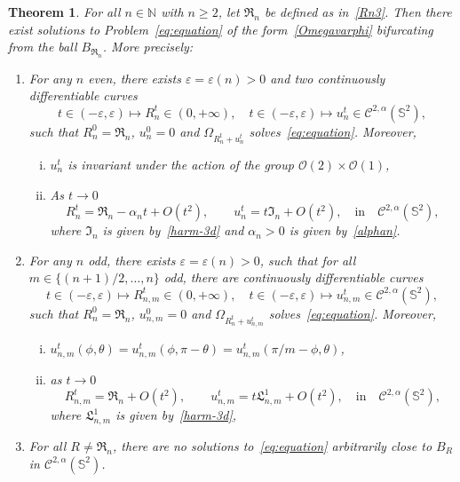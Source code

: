 \documentclass[10pt,reqno,english]{amsart}
\newcommand{\Sd}{\mathbb{S}^2}
\newcommand{\rn}{{\mathfrak R}_n  }
\newcommand{\ve}{\varepsilon}
\newtheorem{theorem}{Theorem}
\theoremstyle{definition}
\numberwithin{equation}{section}
\begin{document}
\begin{theorem}
\label{thm_N=3}
For all $n \in \mathbb{N}$ with $n \ge 2$, let $\rn$ be defined as in~\eqref{Rn3}. Then there exist solutions to Problem~\eqref{eq:equation} of the form~\eqref{Omegavarphi} bifurcating from the ball $B_{\rn}$. More precisely:

\begin{enumerate}[$\!\!$(1)$\!\!$]
\item For any $n$ even, there exists $\ve=\ve(n)>0$ and  two continuously differentiable curves
\[
t\in(-\ve,\ve)\mapsto R_n^t\in(0,+\infty), \quad t\in(-\ve,\ve)\mapsto u_n^t\in\mathcal C^{2,\alpha}(\Sd),
\]
such that $R_n^0= \rn$, $u_n^0=0$ and $\Omega_{R_n^t+u_n^t}$ solves~\eqref{eq:equation}. Moreover,
\begin{enumerate}[i)]
\item $u_n^t$ is invariant under the action of the group $\mathcal O(2)\times \mathcal O(1)$, 
\item As $t \to 0$
\[
R_n^t= \rn-\alpha_n t+ O(t^2),\qquad u_n^t=t \mathfrak I_n+O(t^2), \quad {\mbox {in}} \quad \mathcal C^{2,\alpha}(\Sd), 
\]
where $\mathfrak I_n$ is given by~\eqref{harm-3d} and $\alpha_n>0$ is given by~\eqref{alphan}.
\end{enumerate}
\item For any $n$  odd, there exists $\ve=\ve(n)>0$, such that for all $m\in\{(n+1)/2,\dots,n\}$ odd,  there are continuously differentiable curves 
\[
t\in(-\ve,\ve)\mapsto R_{n,m}^t\in(0,+\infty), \quad t\in(-\ve,\ve)\mapsto u_{n,m}^t\in\mathcal C^{2,\alpha}(\Sd),
\]
such that $R_n^0= \rn$, $u_{n,m}^0=0$ and $\Omega_{R_n^t+u_{n,m}^t}$ solves~\eqref{eq:equation}. 
Moreover,
\begin{enumerate}[i)]
\item $u_{n,m}^t(\phi,\theta)=u_{n,m}^t(\phi,\pi-\theta)=u_{n,m}^t(\pi/m-\phi,\theta)$,
\item as $t \to 0$
\[
R_{n,m}^t= \rn+ O(t^2),\qquad u_{n,m}^t=t \mathfrak L^1_{n,m} +O(t^2), \quad {\mbox {in}} \quad \mathcal C^{2,\alpha}(\Sd),
\]
where $\mathfrak L^1_{n,m}$ is given by~\eqref{harm-3d},
\end{enumerate}
\item For all $R\not=\rn$, there are no solutions to~\eqref{eq:equation} arbitrarily close to $B_R$ in $\mathcal C^{2,\alpha}(\Sd)$.
\end{enumerate}
\end{theorem}
\end{document}
